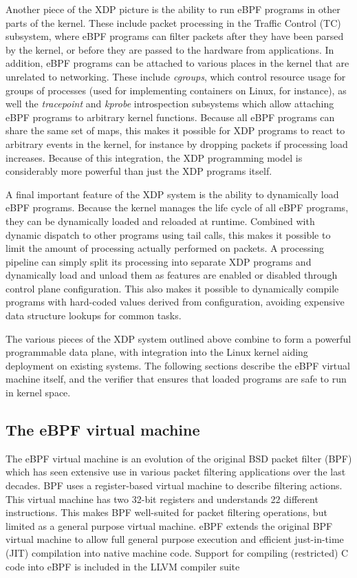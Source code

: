 \documentclass[10pt]{sig-alternate-05-2015}
\begin{document}
Another piece of the XDP picture is the ability to run eBPF programs in other
parts of the kernel. These include packet processing in the Traffic Control (TC)
subsystem, where eBPF programs can filter packets after they have been parsed by
the kernel, or before they are passed to the hardware from applications. In
addition, eBPF programs can be attached to various places in the kernel that are
unrelated to networking. These include \emph{cgroups}, which control resource usage
for groups of processes (used for implementing containers on Linux, for
instance), as well the \emph{tracepoint} and \emph{kprobe} introspection subsystems which
allow attaching eBPF programs to arbitrary kernel functions. Because all eBPF
programs can share the same set of maps, this makes it possible for XDP programs
to react to arbitrary events in the kernel, for instance by dropping packets if
processing load increases. Because of this integration, the XDP programming
model is considerably more powerful than just the XDP programs itself.

A final important feature of the XDP system is the ability to dynamically load
eBPF programs. Because the kernel manages the life cycle of all eBPF programs,
they can be dynamically loaded and reloaded at runtime. Combined with dynamic
dispatch to other programs using tail calls, this makes it possible to limit the
amount of processing actually performed on packets. A processing pipeline can
simply split its processing into separate XDP programs and dynamically load and
unload them as features are enabled or disabled through control plane
configuration. This also makes it possible to dynamically compile programs with
hard-coded values derived from configuration, avoiding expensive data structure
lookups for common tasks.

The various pieces of the XDP system outlined above combine to form a powerful
programmable data plane, with integration into the Linux kernel aiding
deployment on existing systems. The following sections describe the eBPF virtual
machine itself, and the verifier that ensures that loaded programs are safe to
run in kernel space.

\subsection{The eBPF virtual machine}
\label{sec:bpf-vm}
The eBPF virtual machine is an evolution of the original BSD packet filter (BPF)
\cite{mccanne_bsd_1993} which has seen extensive use in various packet filtering
applications over the last decades. BPF uses a register-based virtual machine to
describe filtering actions. This virtual machine has two 32-bit registers and
understands 22 different instructions. This makes BPF well-suited for packet
filtering operations, but limited as a general purpose virtual machine. eBPF
extends the original BPF virtual machine to allow full general purpose execution
and efficient just-in-time (JIT) compilation into native machine code. Support
for compiling (restricted) C code into eBPF is included in the LLVM compiler
suite
\end{document}
